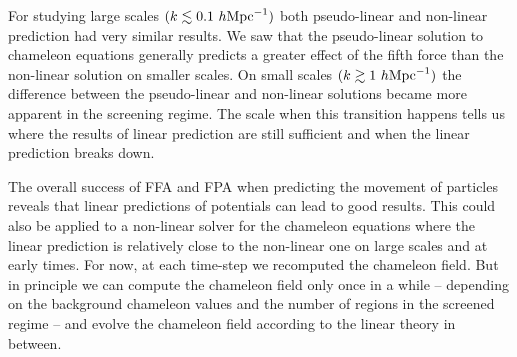 For studying large scales $(k\lesssim0.1~h\text{Mpc}^{-1})$ both pseudo-linear and non-linear prediction had very similar results. We saw that the pseudo-linear solution to chameleon equations generally predicts a greater effect of the fifth force than the non-linear solution on smaller scales. On small scales $(k\gtrsim1~h\text{Mpc}^{-1})$ the difference between the pseudo-linear and non-linear solutions became more apparent in the screening regime. The scale when this transition happens tells us where the results of linear prediction are still sufficient and when the linear prediction breaks down.

The overall success of FFA and FPA when predicting the movement of particles reveals that linear predictions of potentials can lead to good results. This could also be applied to a non-linear solver for the chameleon equations where the linear prediction is relatively close to the non-linear one on large scales and at early times. For now, at each time-step we recomputed the chameleon field. But in principle we can compute the chameleon field only once in a while -- depending on the background chameleon values and the number of regions in the screened regime -- and evolve the chameleon field according to the linear theory in between.

